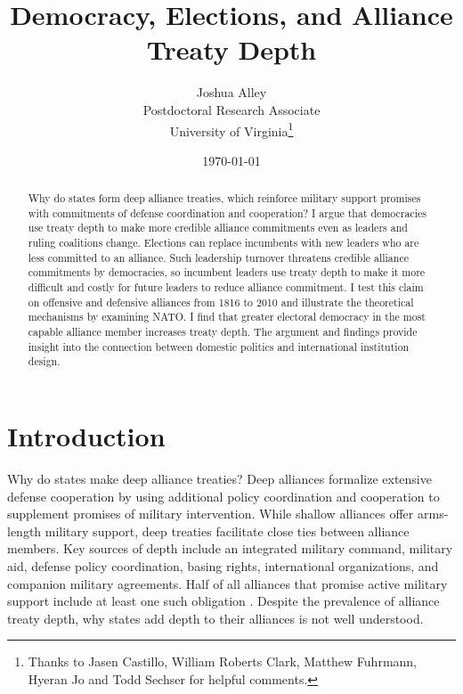 \documentclass[12pt]{article}
\title{\textbf{Democracy, Elections, and Alliance Treaty Depth}}
\author{Joshua Alley \\
Postdoctoral Research Associate \\
University of Virginia\thanks{Thanks to Jasen Castillo, William Roberts Clark, Matthew Fuhrmann, Hyeran Jo and Todd Sechser for helpful comments.} 
}
\date{\today}
\begin{document}
\maketitle 

\doublespace 

\begin{abstract}
Why do states form deep alliance treaties, which reinforce military support promises with commitments of defense coordination and cooperation? 
I argue that democracies use treaty depth to make more credible alliance commitments even as leaders and ruling coalitions change. 
Elections can replace incumbents with new leaders who are less committed to an alliance. 
Such leadership turnover threatens credible alliance commitments by democracies, so incumbent leaders use treaty depth to make it more difficult and costly for future leaders to reduce alliance commitment. 
I test this claim on offensive and defensive alliances from 1816 to 2010 and illustrate the theoretical mechanisms by examining NATO.
I find that greater electoral democracy in the most capable alliance member increases treaty depth. 
The argument and findings provide insight into the connection between domestic politics and international institution design. 
\end{abstract}


\newpage 


\section{Introduction}


Why do states make deep alliance treaties? 
Deep alliances formalize extensive defense cooperation by using additional policy coordination and cooperation to supplement promises of military intervention. 
While shallow alliances offer arms-length military support, deep treaties facilitate close ties between alliance members. 
Key sources of depth include an integrated military command, military aid, defense policy coordination, basing rights, international organizations, and companion military agreements.
Half of all alliances that promise active military support include at least one such obligation \citep{Leedsetal2002}. 
Despite the prevalence of alliance treaty depth, why states add depth to their alliances is not well understood. 
\end{document}
